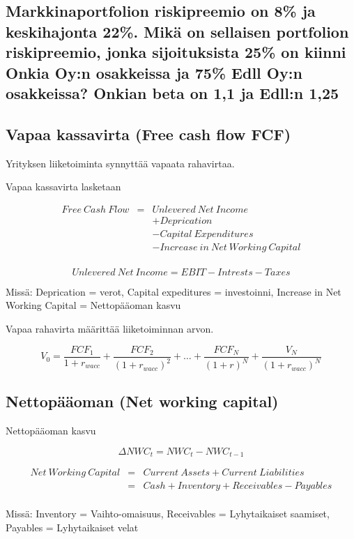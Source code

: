\documentclass[a4paper]{article}
\begin{document}
\subsection{Markkinaportfolion riskipreemio on 8\% ja keskihajonta 22\%. Mikä on sellaisen portfolion riskipreemio, jonka sijoituksista 25\% on kiinni Onkia Oy:n osakkeissa ja 75\% Edll Oy:n osakkeissa? Onkian beta on 1,1 ja Edll:n 1,25}

\subsection{Vapaa kassavirta (Free cash flow FCF)}

Yrityksen liiketoiminta synnyttää vapaata rahavirtaa.

Vapaa kassavirta lasketaan

\[
\begin{array}{lcl}
Free\ Cash\ Flow & = & Unlevered\ Net\ Income \\
 & & + Deprication \\
 & & - Capital\ Expenditures \\
 & & - Increase\ in\ Net\ Working\ Capital \\
\end{array}
\]

\[Unlevered\ Net\ Income = EBIT - Intrests - Taxes\]


Missä: Deprication = verot, Capital expeditures = investoinni, Increase in Net Working Capital = Nettopääoman kasvu

Vapaa rahavirta määrittää liiketoiminnan arvon.

\[
V_0 = \frac{FCF_1}{1 + r_{wacc}} + \frac{FCF_2}{(1 + r_{wacc})^2} + \dots + \frac{FCF_N}{(1 + r)^N} + \frac{V_N}{(1 + r_{wacc})^N}
\]

\subsection{Nettopääoman (Net working capital)}

Nettopääoman kasvu

\[ \Delta NWC_t = NWC_t - NWC_{t-1} \]

\[
\begin{array}{lcl}
Net\ Working\ Capital & = & Current\ Assets + Current\ Liabilities \\
 & = & Cash + Inventory + Receivables - Payables \\
\end{array}
\]

Missä: Inventory = Vaihto-omaisuus, Receivables = Lyhytaikaiset saamiset, Payables = Lyhytaikaiset velat
\end{document}
